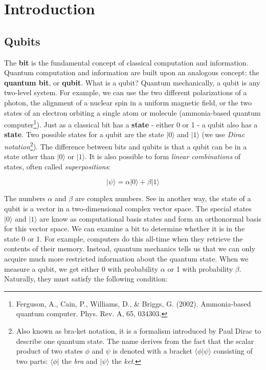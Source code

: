 \chapter{Introduction}


\section{Qubits}
The \textbf{bit} is the fundamental concept of classical computation and information. Quantum computation and information are built upon an analogous concept: the \textbf{quantum bit}, or \textbf{qubit}. What is a qubit? Quantum mechanically, a qubit is any two-level system. For example, we can use the two different polarizations of a photon, the alignment of a nuclear spin in a
uniform magnetic field, or the two states of an electron orbiting a single atom or molecule (ammonia-based quantum computer\footnote{Ferguson, A., Cain, P., Williams, D., \& Briggs, G. (2002). Ammonia-based quantum computer. Phys. Rev. A, 65, 034303.}). Just as a classical bit has a \textbf{state} - either 0 or 1 - a qubit also has a \textbf{state}. Two possible states for a qubit are the state $|0\rangle$ and $|1\rangle$ (we use \textit{Dirac notation}\footnote{Also known as bra-ket notation, it is a formalism introduced by Paul Dirac to describe one quantum state. The name derives from the fact that the scalar product of two states $\phi$ and $\psi$ is denoted with a bracket $\langle\phi|\psi\rangle$ consisting of two parts: $\langle\phi|$ the \textit{bra} and $|\psi\rangle$ the \textit{ket}.}). The difference between bits and qubits is that a qubit can be in a state other than $|0\rangle$  or $|1\rangle$. It is also possible to form \textit{linear combinations} of states, often called \textit{superpositions}:

\begin{equation*}
    |\psi\rangle=\alpha|0\rangle + \beta|1\rangle
\end{equation*}

The numbers $\alpha$ and $\beta$ are complex numbers. See in another way, the state of a qubit is a vector in a two-dimensional complex vector space. The special states $|0\rangle$ and $|1\rangle$ are know as computational basis states and form an orthonormal basis for this vector space. We can examine a bit to determine whether it is in the state 0 or 1. For example, computers do this all-time when they retrieve the contents of their memory. Instead, quantum mechanics tells us that we can only acquire much more restricted information about the quantum state. When we measure a qubit, we get either 0 with probability $\alpha$ or 1 with probability $\beta$. Naturally, they must satisfy the following condition:

